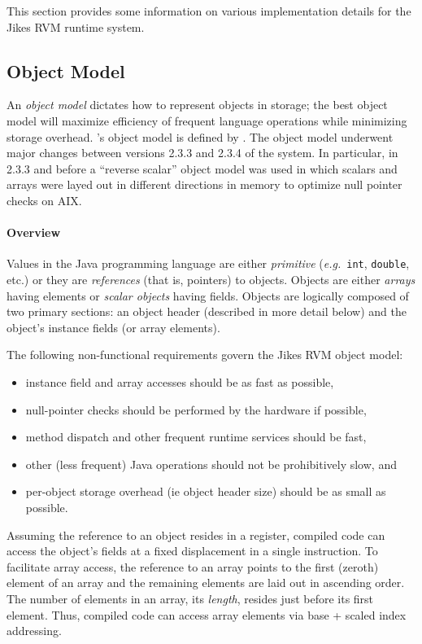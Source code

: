 This section provides some information on various
implementation details for the Jikes\TMweb{} RVM runtime system.

\subsection{Object Model}\label{sssec:objects}

An {\em object model} dictates how to represent objects in storage;
the best object model will maximize efficiency of frequent language
operations while minimizing storage overhead. \jrvm's
object model is defined by 
.
The \jrvm object model underwent major changes between versions
2.3.3 and 2.3.4 of the system.  In particular, in 2.3.3 and before a 
``reverse scalar'' object model was used in which scalars and arrays
were layed out in different directions in memory to optimize null
pointer checks on AIX. 

\paragraph{Overview}
Values in the Java\TMweb{} programming language are either {\em
primitive} ({\it e.g.}\ {\tt int}, {\tt double}, etc.)  or they are
{\em references} (that is, pointers) to objects.  Objects are either
{\em arrays} having elements or {\em scalar objects} having fields.
Objects are logically composed of two primary sections: an object
header (described in more detail below) and the object's instance
fields (or array elements).

The following non-functional requirements govern the Jikes RVM object model:
\begin{itemize}
\item
instance field and array accesses should be as fast as possible,
\item
null-pointer checks should be performed by the hardware if possible, 
\item
method dispatch and other frequent runtime services should be fast,
\item
other (less frequent) Java operations should not be prohibitively
slow, and
\item
per-object storage overhead (ie object header size) should be as small
as possible.
\end{itemize}

Assuming the reference to an object resides in a register, compiled
code can access the object's fields at a fixed displacement in a
single instruction.  To facilitate array access, the reference to an
array points to the first (zeroth) element of an array and the
remaining elements are laid out in ascending order.  The number of
elements in an array, its {\em length}, resides just before its first
element. Thus, compiled code can access array elements via base +
scaled index addressing.

